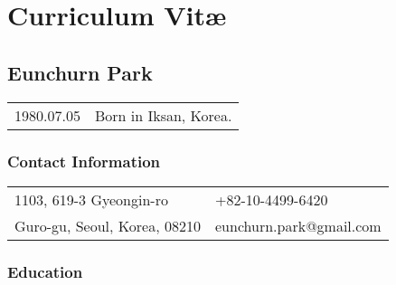 \chapter*{Curriculum Vit\ae}


\section*{Eunchurn Park}
\noindent
\begin{tabular}{p{}l}
    1980.07.05 & Born in Iksan, Korea.
\end{tabular}
\subsection*{Contact Information}

%
%
%
\begin{tabularx}{\textwidth}{@{}XX@{}}
1103, 619-3 Gyeongin-ro    & +82-10-4499-6420 \\
Guro-gu, Seoul, Korea, 08210     & eunchurn.park@gmail.com\\
\end{tabularx}




\subsection*{Education}


